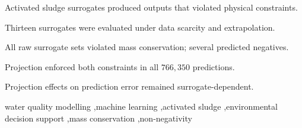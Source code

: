 \documentclass[a4paper,fleqn]{cas-sc}
\begin{document}
\begin{highlights}
\item Activated sludge surrogates produced outputs that violated physical constraints.
\item Thirteen surrogates were evaluated under data scarcity and extrapolation.
\item All raw surrogate sets violated mass conservation; several predicted negatives.
\item Projection enforced both constraints in all $766{,}350$ predictions.
\item Projection effects on prediction error remained surrogate-dependent.
\end{highlights}

\begin{keywords}
water quality modelling \sep machine learning \sep activated sludge \sep environmental decision support \sep mass conservation \sep non-negativity
\end{keywords}

\maketitle
\end{document}
